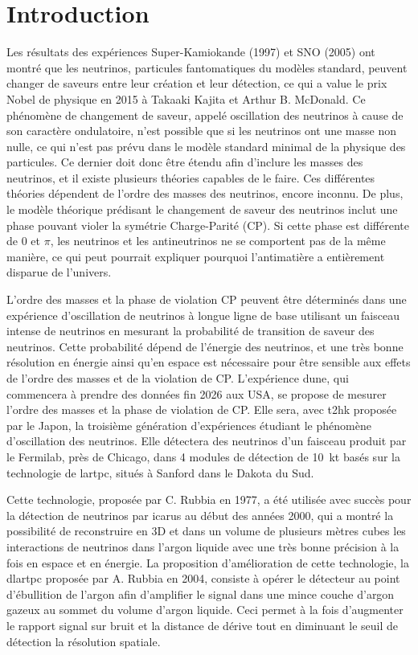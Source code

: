 \chapter{Introduction}

Les résultats des expériences Super-Kamiokande (1997) et SNO (2005) ont montré que les neutrinos, particules fantomatiques du modèles standard, peuvent changer de saveurs entre leur création et leur détection, ce qui a value le prix Nobel de physique en 2015 à Takaaki Kajita et Arthur B. McDonald.  Ce phénomène de changement de saveur, appelé oscillation des neutrinos à cause de son caractère ondulatoire, n'est possible que si les neutrinos ont une masse non nulle, ce qui n'est pas prévu dans le modèle standard minimal de la physique des particules. Ce dernier doit donc être étendu afin d'inclure les masses des neutrinos, et il existe plusieurs théories capables de le faire. Ces différentes théories dépendent de l'ordre des masses des neutrinos, encore inconnu. De plus, le modèle théorique prédisant le changement de saveur des neutrinos inclut une phase pouvant violer la symétrie Charge-Parité (CP). Si cette phase est différente de 0 et $\pi$, les neutrinos et les antineutrinos ne se comportent pas de la même manière, ce qui peut pourrait expliquer pourquoi l'antimatière a entièrement disparue de l'univers. 

L'ordre des masses et la phase de violation CP peuvent être déterminés dans une expérience d'oscillation de neutrinos à longue ligne de base utilisant un faisceau intense de neutrinos en mesurant la probabilité de transition de saveur des neutrinos. Cette probabilité dépend de l'énergie des neutrinos, et une très bonne résolution en énergie ainsi qu'en espace est nécessaire pour être sensible aux effets de l'ordre des masses et de la violation de CP. L'expérience \gls{dune}, qui commencera à prendre des données fin 2026 aux USA, se propose de mesurer l'ordre des masses et la phase de violation de CP. Elle sera, avec \acrshort{t2hk} proposée par le Japon, la troisième génération d'expériences étudiant le phénomène d'oscillation des neutrinos. Elle détectera des neutrinos d'un faisceau produit par le Fermilab, près de Chicago, dans 4 modules de détection de \SI{10}{\kilo\tonne} basés sur la technologie de \gls{lartpc}, situés à Sanford dans le Dakota du Sud.

Cette technologie, proposée par C. Rubbia en 1977, a été utilisée avec succès pour la détection de neutrinos par \acrshort{icarus} au début des années 2000, qui a montré la possibilité de reconstruire en 3D et dans un volume de plusieurs mètres cubes les interactions de neutrinos dans l'argon liquide avec une très bonne précision à la fois en espace et en énergie. La proposition d'amélioration de cette technologie, la \gls{dlartpc} proposée par A. Rubbia en 2004, consiste à opérer le détecteur au point d'ébullition de l'argon afin d'amplifier le signal dans une mince couche d'argon gazeux au sommet du volume d'argon liquide. Ceci permet à la fois d'augmenter le rapport signal sur bruit et la distance de dérive tout en diminuant le seuil de détection la résolution spatiale. 

